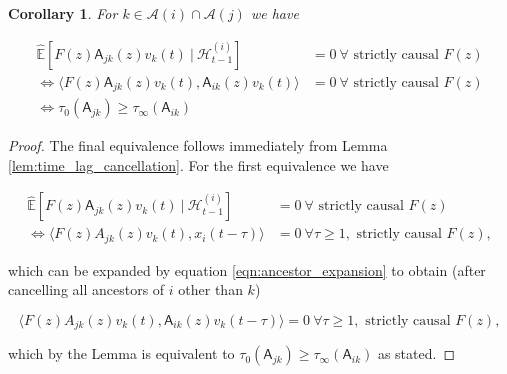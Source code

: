 \documentclass{statsoc}
\def\A{\mathsf{A}}  %
\def\H{\mathcal{H}}  %
\newcommand{\linE}[2]{\hat{\E}[#1\ |\ #2]}  %
\newcommand{\anc}[1]{\mathcal{A}(#1)}  %
\newtheorem{corollary}{Corollary}
\def\H{\mathcal{H}}  %
\def\E{\mathbb{E}}  %
\newcommand{\inner}[2]{\langle #1, #2 \rangle}  %
\begin{document}
\begin{corollary}
  \label{cor:time_lag_cancellation}
  For $k \in \anc{i} \cap \anc{j}$ we have

  \begin{align*}
    \linE{F(z)\A_{jk}(z)v_k(t)}{\H_{t - 1}^{(i)}} &= 0\ \forall \text{ strictly causal } F(z)\\
    \iff \inner{F(z)\A_{jk}(z)v_k(t)}{\A_{ik}(z)v_k(t)} &= 0\ \forall \text{ strictly causal } F(z)\\
    \iff \tau_0(\A_{jk}) \ge \tau_\infty(\A_{ik})
  \end{align*}
\end{corollary}
\begin{proof}
  The final equivalence follows immediately from Lemma \ref{lem:time_lag_cancellation}.  For the first equivalence we have

  \begin{align*}
    \linE{F(z)\A_{jk}(z)v_k(t)}{\H_{t - 1}^{(i)}} &= 0\ \forall \text{ strictly causal } F(z)\\
    \iff \inner{F(z)A_{jk}(z)v_k(t)}{x_i(t - \tau)} &= 0\ \forall \tau \ge 1, \text{ strictly causal } F(z),
  \end{align*}

  which can be expanded by equation \eqref{eqn:ancestor_expansion} to
  obtain (after cancelling all ancestors of $i$ other than $k$)

  \begin{equation*}
    \inner{F(z)A_{jk}(z)v_k(t)}{\A_{ik}(z)v_k(t - \tau)} = 0\ \forall \tau \ge 1, \text{ strictly causal } F(z),
  \end{equation*}

  which by the Lemma is equivalent to $\tau_0(\A_{jk}) \ge \tau_\infty(\A_{ik})$ as stated.
\end{proof}
\end{document}
